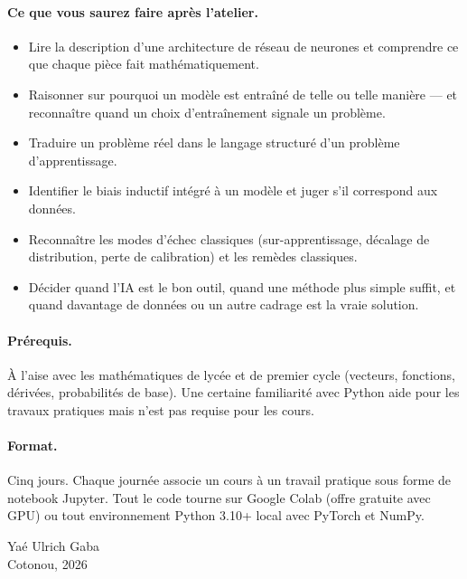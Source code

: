 \documentclass[12pt,a4paper,twoside]{book}
\begin{document}
\paragraph{Ce que vous saurez faire après l'atelier.}
\begin{itemize}
  \item Lire la description d'une architecture de réseau de neurones et comprendre ce que chaque pièce fait mathématiquement.
  \item Raisonner sur pourquoi un modèle est entraîné de telle ou telle manière --- et reconnaître quand un choix d'entraînement signale un problème.
  \item Traduire un problème réel dans le langage structuré d'un problème d'apprentissage.
  \item Identifier le biais inductif intégré à un modèle et juger s'il correspond aux données.
  \item Reconnaître les modes d'échec classiques (sur-apprentissage, décalage de distribution, perte de calibration) et les remèdes classiques.
  \item Décider quand l'IA est le bon outil, quand une méthode plus simple suffit, et quand davantage de données ou un autre cadrage est la vraie solution.
\end{itemize}

\paragraph{Prérequis.} À l'aise avec les mathématiques de lycée et de premier cycle (vecteurs, fonctions, dérivées, probabilités de base). Une certaine familiarité avec Python aide pour les travaux pratiques mais n'est pas requise pour les cours.

\paragraph{Format.} Cinq jours. Chaque journée associe un cours à un travail pratique sous forme de notebook Jupyter. Tout le code tourne sur Google Colab (offre gratuite avec GPU) ou tout environnement Python 3.10+ local avec PyTorch et NumPy.

\vfill
\noindent Yaé Ulrich Gaba\\
Cotonou, 2026

\mainmatter






\end{document}
